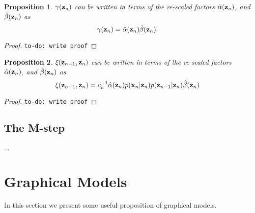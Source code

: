\documentclass[11pt]{article}
\newtheorem{proposition}{Proposition}[section]
\begin{document}

\begin{proposition}
	$\gamma({\bf z}_n)$ can be written in terms of the re-scaled factors $\hat\alpha({\bf z}_n)$, and $\hat\beta({\bf z}_n)$ as
	\begin{equation}
		\gamma({\bf z}_n) = \hat\alpha({\bf z}_n)\hat\beta({\bf z}_n).
	\end{equation}
\end{proposition}

\begin{proof}
	\texttt{to-do: write proof}
\end{proof}

\begin{proposition}
	$\xi({\bf z}_{n-1}, {\bf z}_n)$ can be written in terms of the re-scaled factors $\hat\alpha({\bf z}_n)$, and $\hat\beta({\bf z}_n)$ as
	\begin{equation}
		\xi({\bf z}_{n-1}, {\bf z}_{n}) = c_n^{-1}\hat\alpha({\bf z}_n)p({\bf x}_n \vert {\bf z}_n) p({\bf z}_{n-1}\vert {\bf z}_n)\hat\beta({\bf z}_n)
	\end{equation}
\end{proposition}

\begin{proof}
	\texttt{to-do: write proof}
\end{proof}

\subsection{The M-step}
...

\section{Graphical Models}
In this section we present some useful proposition of graphical models.
\end{document}
